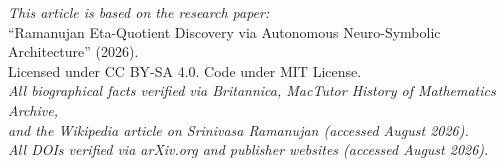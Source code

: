 \documentclass[11pt,a4paper]{article}
\begin{document}
\vspace{1em}
\begin{center}
\small\textit{This article is based on the research paper:}\\
\small``Ramanujan Eta-Quotient Discovery via Autonomous Neuro-Symbolic Architecture'' (2026).\\
\small Licensed under CC BY-SA 4.0. Code under MIT License.\\
\smallskip
\small\textit{All biographical facts verified via Britannica, MacTutor History of Mathematics Archive,}\\
\small\textit{and the Wikipedia article on Srinivasa Ramanujan (accessed August 2026).}\\
\small\textit{All DOIs verified via arXiv.org and publisher websites (accessed August 2026).}
\end{center}
\end{document}
